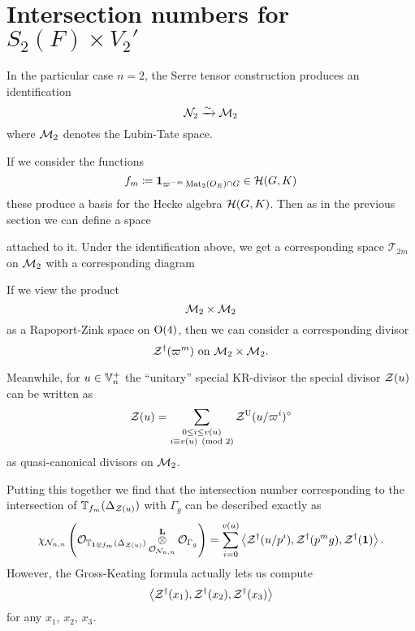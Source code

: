 \chapter{Intersection numbers for $S_2(F) \times V_2'$}

In the particular case $n = 2$,
the Serre tensor construction produces an identification
\[ \mathcal N_2 \xrightarrow{\sim} \mathcal M_2 \]
where $\mathcal M_2$ denotes the Lubin-Tate space.

If we consider the functions
\[ f_m \coloneqq \mathbf{1}_{\varpi^{-m} \operatorname{Mat}_2(O_E) \cap G} \in \mathcal H(G, K) \]
these produce a basis for the Hecke algebra $\mathcal H(G, K)$.
Then as in the previous section we can define a space
\begin{center}
\end{center}
attached to it.
Under the identification above, we get a corresponding space $\mathcal T_{2m}$
on $\mathcal M_2$ with a corresponding diagram
\begin{center}
\end{center}
If we view the product
\[ \mathcal M_2 \times \mathcal M_2 \]
as a Rapoport-Zink space on $\operatorname{O}(4)$, then we can consider a corresponding divisor
\[ \mathcal Z^{\dagger}(\varpi^m) \text{ on } \mathcal M_2 \times \mathcal M_2. \]

Meanwhile, for $u \in \mathbb V_n^+$ the ``unitary'' special KR-divisor
the special divisor $\mathcal Z(u)$ can be written as
\[ \mathcal Z(u)
  = \sum_{\substack{0 \le i \le v(u) \\ i \equiv v(u) \pmod 2}} \mathcal Z^{\operatorname{U}}(u/\varpi^i)^\circ
\]
as quasi-canonical divisors on $\mathcal M_2$.

Putting this together we find that the intersection number
corresponding to the intersection of $\mathbb T_{f_m}(\Delta_{\mathcal Z(u)})$ with $\Gamma_g$
can be described exactly as
\[ \chi_{\mathcal N_{n,n}} \left(
      \mathcal{O}_{\mathbb T_{\mathbf{1} \otimes f_m}(\Delta_{\mathcal Z(u)})}
      \mathop{\otimes}^{\mathbf{L}}_{\mathcal{O}_{\mathcal N_{n,n}}} \mathcal{O}_{\Gamma_g} \right)
  = \sum_{i=0}^{v(u)} \left< \mathcal Z^{\dagger}(u/p^i), \mathcal Z^{\dagger}(p^m g), \mathcal Z^{\dagger}(\mathbf{1}) \right>. \]
However, the Gross-Keating formula actually lets us compute
\[ \left< \mathcal Z^{\dagger}(x_1), \mathcal Z^{\dagger}(x_2), \mathcal Z^{\dagger}(x_3) \right> \]
for any $x_1$, $x_2$, $x_3$.
